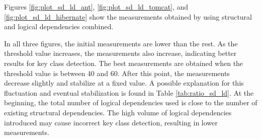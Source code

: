 \begin{table}[!h]
\renewcommand{\arraystretch}{1}
\caption{Percentage of logical dependencies that are also structural dependencies}
\label{tab:overlap}
\centering
{}
\end{table}



\begin{table}[!h]
\renewcommand{\arraystretch}{1}
\caption{Ratio between structural and logical dependencies (SD/LD)}
\label{tab:ratio_sd_ld}
\centering
{}
\end{table}

Figures \ref{fig:plot_sd_ld_ant}, \ref{fig:plot_sd_ld_tomcat}, and \ref{fig:plot_sd_ld_hibernate} show the measurements obtained by using structural and logical dependencies combined.

In all three figures, the initial measurements are lower than the rest. As the threshold value increases, the measurements also increase, indicating better results for key class detection. The best measurements are obtained when the threshold value is between 40 and 60. After this point, the measurements decrease slightly and stabilize at a fixed value. A possible explanation for this fluctuation and eventual stabilization is found in Table \ref{tab:ratio_sd_ld}. At the beginning, the total number of logical dependencies used is close to the number of existing structural dependencies. The high volume of logical dependencies introduced may cause incorrect key class detection, resulting in lower measurements.

